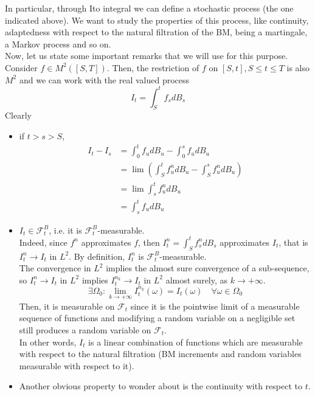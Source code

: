 In particular, through Ito integral we can define a stochastic process (the one indicated above). We want to study the properties of this process, like continuity, adaptedness with respect to the natural filtration of the BM, being a martingale, a Markov process and so on. \\
Now, let us state some important remarks that we will use for this purpose. \\
Consider $f \in M^2([S,T])$. Then, the restriction of $f$ on $[S,t], S \leq t \leq T$ is also $M^2$ and we can work with the real valued process
\begin{equation*}
    I_t=\int_S^t f_s dB_s
\end{equation*}
Clearly 
\begin{itemize}
    \item if $t > s > S$, 
    \begin{align*}
        I_t - I_s &= \int_0^t f_u dB_u - \int_0^s f_u dB_u \\
        &= \lim(\int_S^t f_u^n dB_u - \int_S^s f_u^n dB_u) \\
        &= \lim \int_s^t f_u^n dB_u \\
        &= \int_s^t f_u dB_u
    \end{align*}
    \item $I_t \in \mathcal{F}_t^B$, i.e. it is $\mathcal{F}_t^B$-measurable. \\
    Indeed, since $f^n$ approximates $f$, then $I_t^n = \int_S^t f_s^n dB_s$ approximates $I_t$, that is $I_t^n \rightarrow I_t$ in $L^2$. By definition, $I_t^n$ is $\mathcal{F}_t^B$-measurable. \\
    The convergence in $L^2$ implies the almost sure convergence of a sub-sequence, so $I_t^n \rightarrow I_t$ in $L^2$ implies $I_t^{n_k} \rightarrow I_t$ in $L^2$ almost surely, as $k \rightarrow +\infty$. 
    \begin{equation*}
        \exists \Omega_0: \lim_{k \rightarrow +\infty} I_t^{n_k}(\omega) = I_t(\omega) \quad \forall \omega \in \Omega_0
    \end{equation*}
    Then, it is measurable on $\mathcal{F}_t$ since it is the pointwise limit of a measurable sequence of functions and modifying a random variable on a negligible set still produces a random variable on $\mathcal{F}_t$. \\
    In other words, $I_t$ is a linear combination of functions which are measurable with respect to the natural filtration (BM increments and random variables measurable with respect to it). 
    \item Another obvious property to wonder about is the continuity with respect to $t$.\\

\end{itemize}
